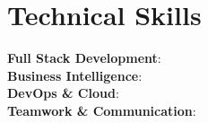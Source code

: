 \section{\textbf{Technical Skills}}
\begin{itemize}[leftmargin=0.1in, label={}]
   \small{\item{
    \textbf{Full Stack Development}{: }  \\
    \textbf{Business Intelligence}{: }  \\
    \textbf{DevOps \& Cloud}{: }  \\
    \textbf{Teamwork \& Communication}{: }  \\
   }}
\end{itemize}
\vspace{-16pt} 